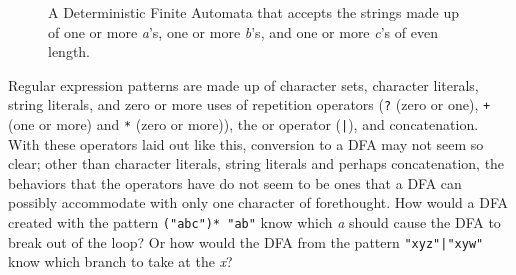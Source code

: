 {{\begin{figure}
\begin{center}
			\end{center}
			
			\caption{A Deterministic Finite Automata that
				accepts the strings made up of one or more \textit{a}'s,
				one or more \textit{b}'s, and one or more \textit{c}'s
				of even length.}
		\end{figure}
		
		Regular expression patterns are made up of character sets,
		character literals, string literals, and zero or more uses of
		repetition operators (\texttt{?} (zero or one),
		\texttt{+} (one or more) and \texttt{*} (zero or more)),
		the or operator (\texttt{|}), and concatenation. With these operators
		laid out like this, conversion to a DFA may not seem so clear;
		other than character literals, string literals and perhaps concatenation,
		the behaviors that the operators have do not seem to be
		ones that a DFA can possibly accommodate with only
		one character of forethought.
		How would a DFA created with the pattern \texttt{("abc")* "ab"} know which
		\textit{a} should cause the DFA to break out of the loop?
		Or how would the DFA from the
		pattern \texttt{"xyz"|"xyw"} know which branch to take
		at the \textit{x}?
		
		
		
		\begin{figure}
			\begin{center}
				\begin{tikzpicture}[
					style={font=\vphantom{Ag}},
					inner sep=0pt,
					minimum size=0.0cm
					]
					

\end{tikzpicture}
\end{center}
\end{figure}}}
